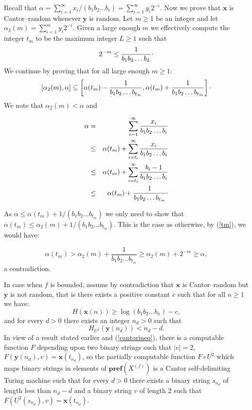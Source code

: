 \documentclass[12pt]{iopart}
\begin{document}
Recall that $\alpha = \sum_{i=1}^{\infty} x_{i}/(b_{1} b_{2}\ldots b_{i}) =
\sum_{i=1}^{\infty} y_{i}2^{-i}$. Now we prove that ${\mathbf x}$ is Cantor--random
whenever ${\mathbf y}$ is random. Let $m\ge 1$ be an integer and let $\alpha_{2}(m)
= \sum_{i=1}^{m} y_{i}2^{-i}$. Given  a large enough $m$ we effectively
compute the integer $t_{m}$ to be the maximum integer $L\ge 1$ such that
\begin{equation}
\label{tm}
2^{-m} \le \frac{1}{b_{1}b_{2}\ldots b_{L}}{\raisebox{.5ex}{.}}
\end{equation}
We continue by proving that for all large enough  $m\ge 1$:
\begin{equation}
\label{cantorineq}
[\alpha_{2}(m), \alpha] \subseteq \left[\alpha (t_{m})
-
\frac{1}{b_{1}b_{2}\ldots b_{t_{m}}}, \alpha (t_{m}) +
\frac{1}{b_{1}b_{2}\ldots b_{t_{m}}}\right]{\raisebox{.5ex}{.}}
\end{equation}
We note that $\alpha_{2}(m) < \alpha$ and


\begin{eqnarray*}
\alpha & = &  \sum_{i=1}^{\infty} \frac{x_{i}}{b_{1}b_{2}\ldots b_{i}} \\
& \le &  \alpha (t_{m}) + \sum_{i=t_{l}}^{\infty}
\frac{x_{i}}{b_{1}b_{2}\ldots b_{i}} \\
& \le & \alpha (t_{m}) + \sum_{i=t_{l}}^{\infty}
\frac{b_{i}-1}{b_{1}b_{2}\ldots b_{i}} \\
& \le & \alpha (t_{m}) + \frac{1}{b_{1}b_{2}\ldots b_{t_{m}}} {\raisebox{.5ex}{.}}
\end{eqnarray*}

As $\alpha \le \alpha (t_{m}) + 1/(b_{1}b_{2}\ldots b_{t_{m}})$ we only need
to show that $\alpha (t_{m}) \le \alpha_{2} (m)+ 1/(b_{1}b_{2}\ldots
b_{t_{m}})$. This is the case as otherwise, by  (\ref{tm}), we would have:

\[\alpha (t_{m}) > \alpha_{2} (m) +
 \frac{1}{b_{1}b_{2}\ldots b_{t_{m}}} \ge \alpha_{2} (m) + 2^{-m}
 \ge \alpha,\]
 a contradiction.


In case when $f$ is bounded, assume by contradiction that ${\mathbf x}$ is
Cantor--random but ${\mathbf y}$ is not random, that is there exists a positive
constant $c$ such that for all $n\ge 1$ we have:
\begin{equation}
\label{crand}
H({\mathbf x}(n)) \ge \log (b_{1}b_{2}\ldots b_{n}) -c,
\end{equation}
and for every $d>0$ there exists an integer $n_{d}>0$ such that
\begin{equation}
\label{not-brand}
H_{U^{2}} ({\mathbf y}(n_{d})) < n_{d} - d.
\end{equation}
In view of a result stated earlier
 and (\ref{cantorineq}), there is a
computable function $F$ depending upon two binary strings such that $|v|=2$,
$F({\mathbf y} (n_{d}), v) =
{\mathbf x} (t_{n_{d}})$, so the partially computable function $F \circ U^{2}$
which
maps binary strings in elements of ${{\mathbf{pref}({{X^{(f)}}})}}$ is a
Cantor self-delimiting
Turing machine such that for every $d>0$ there exists a binary string
$s_{n_{d}}$ of length less than
$n_{d} - d$ and a binary string $v$ of length  2 such that
$F(U^{2}(s_{n_{d}}), v) = {\mathbf x}(t_{n_{d}})$.
\end{document}
